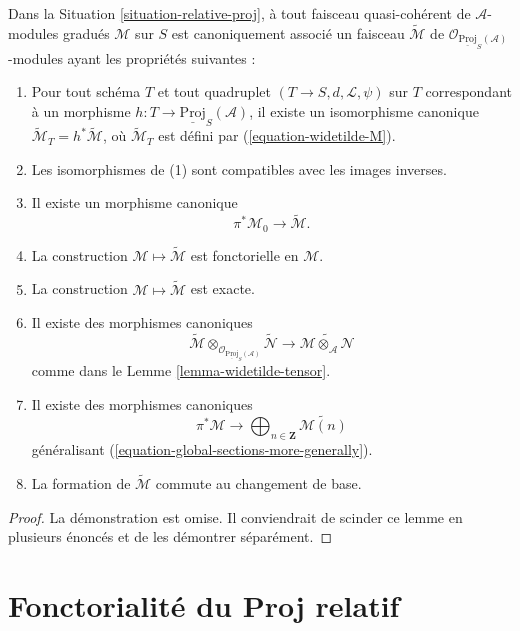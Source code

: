 \begin{lemma}
\label{lemma-relative-proj-modules}
Dans la Situation \ref{situation-relative-proj}, à tout faisceau
quasi-cohérent de $\mathcal{A}$-modules gradués $\mathcal{M}$ sur $S$ est
canoniquement associé un faisceau
$\widetilde{\mathcal{M}}$ de
$\mathcal{O}_{\underline{\text{Proj}}_S(\mathcal{A})}$-modules ayant les
propriétés suivantes :
\begin{enumerate}
\item Pour tout schéma $T$ et tout quadruplet
$(T \to S, d, \mathcal{L}, \psi)$ sur $T$ correspondant à un morphisme
$h : T \to \underline{\text{Proj}}_S(\mathcal{A})$, il existe un
isomorphisme canonique
$\widetilde{\mathcal{M}}_T = h^*\widetilde{\mathcal{M}}$,
où $\widetilde{\mathcal{M}}_T$ est défini par (\ref{equation-widetilde-M}).
\item Les isomorphismes de (1) sont compatibles avec les images inverses.
\item Il existe un morphisme canonique
$$
\pi^*\mathcal{M}_0 \longrightarrow \widetilde{\mathcal{M}}.
$$
\item La construction $\mathcal{M} \mapsto \widetilde{\mathcal{M}}$ est
fonctorielle en $\mathcal{M}$.
\item La construction $\mathcal{M} \mapsto \widetilde{\mathcal{M}}$ est
exacte.
\item Il existe des morphismes canoniques
$$
\widetilde{\mathcal{M}}
\otimes_{\mathcal{O}_{\underline{\text{Proj}}_S(\mathcal{A})}}
\widetilde{\mathcal{N}}
\longrightarrow
\widetilde{\mathcal{M} \otimes_\mathcal{A} \mathcal{N}}
$$
comme dans le Lemme \ref{lemma-widetilde-tensor}.
\item Il existe des morphismes canoniques
$$
\pi^*\mathcal{M}
\longrightarrow
\bigoplus\nolimits_{n \in \mathbf{Z}}
\widetilde{\mathcal{M}(n)}
$$
généralisant (\ref{equation-global-sections-more-generally}).
\item La formation de $\widetilde{\mathcal{M}}$ commute au changement de base.
\end{enumerate}
\end{lemma}

\begin{proof}
La démonstration est omise. Il conviendrait de scinder ce lemme en plusieurs
énoncés et de les démontrer séparément.
\end{proof}


\section{Fonctorialité du Proj relatif}
\label{section-functoriality-relative-proj}

